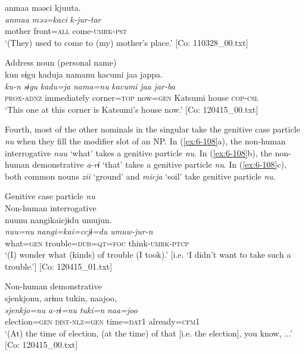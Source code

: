{\TM}
\glll anmaa  məəci  kjuuta.\\
    \textit{anmaa}  \textit{məə=kaci}  \textit{k-jur-tar}\\
      mother  front=\textsc{all}  come-\textsc{umrk}-\textsc{pst}\\
\glt ‘(They) used to come to (my) mother’s place.’ [Co: 110328\_00.txt]

\ex Address noun (personal name)\\
{\TM}
\glll  kun  sɨgu  kaduja  namanu    kacumi  jaa  jappa.\\
\textit{ku-n}  \textit{sɨgu}  \textit{kadu=ja}  \textit{nama=nu}   \textit{kacumi}  \textit{jaa}  \textit{jar-ba}\\
\textsc{prox}-\textsc{adnz}  immediately  corner=\textsc{top}  now=\textsc{gen}  Katsumi  house  \textsc{cop}-\textsc{csl}\\
\glt ‘This one at this corner is Katsumi’s house now.’ [Co: 120415\_00.txt]
\z
\z

  Fourth, most of the other nominals in the singular take the genitive case particle \textit{nu} when they fill the modifier slot of an NP. In (\ref{ex:6-108}a), the non-human interrogative \textit{nuu} ‘what’ takes a genitive particle \textit{nu}. In (\ref{ex:6-108}b), the non-human demonstrative \textit{a-rɨ} ‘that’ takes a genitive particle \textit{nu}. In (\ref{ex:6-108}c), both common nouns \textit{zii} ‘ground’ and \textit{micja} ‘soil’ take genitive particle \textit{nu}.

\ea\label{ex:6-108}
  Genitive case particle \textit{nu}\\
 \ea Non-human interrogative\\
{\TM}
\glll  nuunu  nangikaicjɨdu  umujun.\\
\textit{nuu=nu}  \textit{nangi=kai=ccjɨ=du}  \textit{umuw-jur-n}\\
what=\textsc{gen}  trouble=\textsc{dub}=\textsc{qt}=\textsc{foc}  think-\textsc{umrk}-\textsc{ptcp}\\
\glt ‘(I) wonder what (kinds) of trouble (I took).’ [i.e. ‘I didn’t want to take such a trouble.’]      [Co: 120415\_01.txt]

\ex Non-human demonstrative\\
{\TM}
\glll  {\textbar}sjenkjo{\textbar}nu,  arɨnu  tukin,  naajoo,\\
\textit{sjenkjo=nu}  \textit{a-rɨ=nu}  \textit{tuki=n}  \textit{naa=joo}\\
election=\textsc{gen}  \textsc{dist}-\textsc{nlz}=\textsc{gen}  time=\textsc{dat}1  already=\textsc{cfm}1\\
\glt ‘(At) the time of election, (at the time) of that [i.e. the election], you know, ...’ [Co: 120415\_00.txt]

